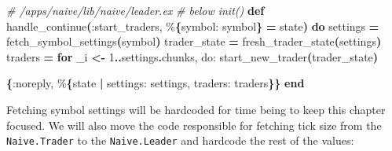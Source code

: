 \documentclass[
  oneside]{book}
\newenvironment{Shaded}{\begin{snugshade}}{\end{snugshade}}
\newcommand{\CommentTok}[1]{\textcolor[rgb]{0.56,0.35,0.01}{\textit{#1}}}
\newcommand{\DecValTok}[1]{\textcolor[rgb]{0.00,0.00,0.81}{#1}}
\newcommand{\FunctionTok}[1]{\textcolor[rgb]{0.13,0.29,0.53}{\textbf{#1}}}
\newcommand{\KeywordTok}[1]{\textcolor[rgb]{0.13,0.29,0.53}{\textbf{#1}}}
\newcommand{\NormalTok}[1]{#1}
\newcommand{\OperatorTok}[1]{\textcolor[rgb]{0.81,0.36,0.00}{\textbf{#1}}}
\newcommand{\VariableTok}[1]{\textcolor[rgb]{0.00,0.00,0.00}{#1}}
\begin{document}
\begin{Shaded}
\begin{Highlighting}[]
  \CommentTok{\# /apps/naive/lib/naive/leader.ex}
  \CommentTok{\# below init()}
  \KeywordTok{def}\NormalTok{ handle\_continue}\FunctionTok{(}\VariableTok{:start\_traders}\NormalTok{, \%}\FunctionTok{\{}\VariableTok{symbol:}\NormalTok{ symbol}\FunctionTok{\}} \OperatorTok{=}\NormalTok{ state}\FunctionTok{)} \KeywordTok{do}
\NormalTok{    settings }\OperatorTok{=}\NormalTok{ fetch\_symbol\_settings}\FunctionTok{(}\NormalTok{symbol}\FunctionTok{)}
\NormalTok{    trader\_state }\OperatorTok{=}\NormalTok{ fresh\_trader\_state}\FunctionTok{(}\NormalTok{settings}\FunctionTok{)}
\NormalTok{    traders }\OperatorTok{=} \KeywordTok{for}\NormalTok{ \_i }\OperatorTok{\textless{}{-}} \DecValTok{1}\OperatorTok{..}\NormalTok{settings}\OperatorTok{.}\NormalTok{chunks,}
              \VariableTok{do:}\NormalTok{ start\_new\_trader}\FunctionTok{(}\NormalTok{trader\_state}\FunctionTok{)}

    \FunctionTok{\{}\VariableTok{:noreply}\NormalTok{, \%}\FunctionTok{\{}\NormalTok{state }\OperatorTok{|} \VariableTok{settings:}\NormalTok{ settings, }\VariableTok{traders:}\NormalTok{ traders}\FunctionTok{\}\}}
  \KeywordTok{end}
\end{Highlighting}
\end{Shaded}

Fetching symbol settings will be hardcoded for time being to keep this chapter focused. We will also move the code responsible for fetching tick
size from the \texttt{Naive.Trader} to the \texttt{Naive.Leader} and hardcode the rest of the values:
\end{document}
